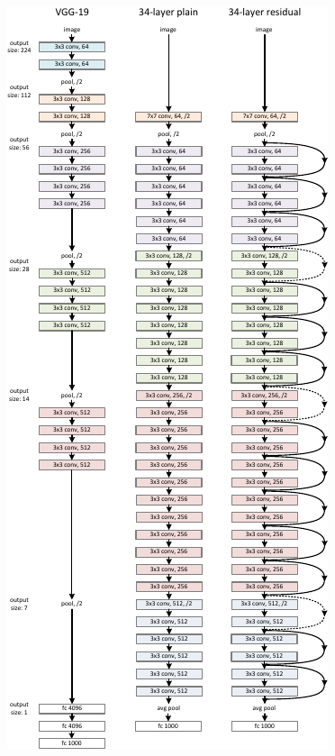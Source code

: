 \documentclass{beamer}[10pt, usepdftitle=false, handout]
\begin{document}
    \begin{frame}
    
    	\begin{figure}
			\includegraphics[scale=0.7]{35.png} 
		\end{figure}
    
    \end{frame}
	    
    
\end{document}
